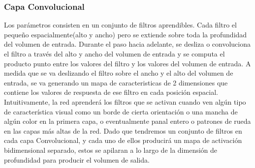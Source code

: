 \documentclass[a4paper,11pt,spanish]{book}
\begin{document}
      \subsubsection{Capa Convolucional}
	Los parámetros consisten en un conjunto de filtros aprendibles. Cada filtro el pequeño espacialmente(alto y ancho) pero se extiende sobre toda la profundidad del volumen de entrada.
	Durante el paso hacia adelante, se desliza o convoluciona el filtro a través del alto y ancho del volumen de entrada y se computa el producto punto entre los valores del filtro y los valores
	del volumen de entrada. A medida que se va deslizando el filtro sobre el ancho y el alto del volumen de entrada, se va generando un mapa de caracteristicas de 2 dimensiones que contiene los
	valores de respuesta de ese filtro en cada posición espacial.\\
	Intuitivamente, la red aprenderá los filtros que se activan cuando ven algún tipo de característica visual como un borde de cierta orientación o una mancha de algún color en la
	primera capa, o eventualmente panal entero o patrones de rueda en las capas más altas de la red. Dado que tendremos un conjunto de filtros en cada capa Convolucional,
	y cada uno de ellos producirá un mapa de activación bidimensional separado, estos se apilaran a lo largo de la dimensión de profundidad para producir el volumen de salida.\\
\end{document}
